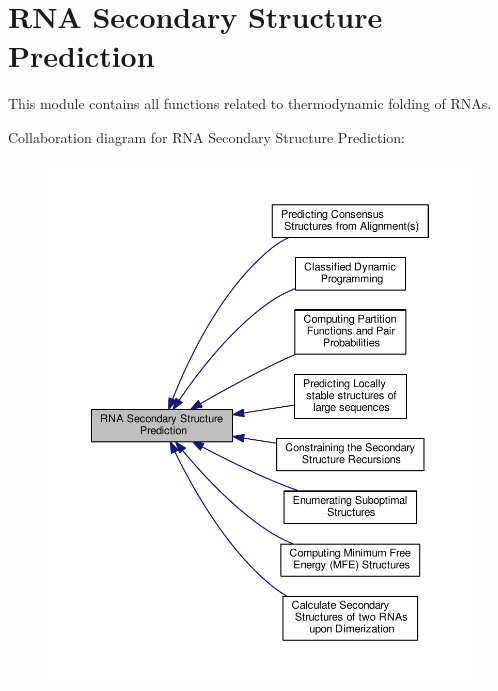 \hypertarget{group__folding__routines}{\section{R\-N\-A Secondary Structure Prediction}
\label{group__folding__routines}
}


This module contains all functions related to thermodynamic folding of R\-N\-As.  


Collaboration diagram for R\-N\-A Secondary Structure Prediction\-:
\nopagebreak
\begin{figure}[H]
\begin{center}
\leavevmode
\includegraphics[width=350pt]{group__folding__routines}
\end{center}
\end{figure}
